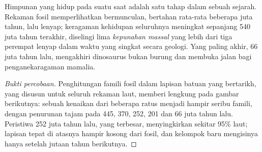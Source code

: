 \begin{proposition}\label{prop:g10:biodiversity-scales:changes}
Himpunan  yang hidup pada suatu saat adalah satu tahap dalam
sebuah sejarah. Rekaman fosil memperlihatkan  bermunculan,
bertahan rata-rata beberapa juta tahun, lalu lenyap; keragaman
kehidupan seluruhnya meningkat sepanjang 540 juta tahun terakhir,
diselingi lima \emph{kepunahan massal} yang
lebih dari tiga perempat  lenyap dalam waktu yang singkat
secara geologi. Yang paling akhir, 66 juta tahun lalu, mengakhiri
dinosaurus bukan burung dan membuka jalan bagi penganekaragaman mamalia.
\end{proposition}
\begin{proof}[Bukti percobaan]
Penghitungan famili fosil dalam lapisan batuan yang bertarikh, yang
disusun untuk seluruh rekaman laut, memberi lengkung pada gambar
berikutnya: sebuah kenaikan dari beberapa ratus menjadi hampir seribu
famili, dengan penurunan tajam pada 445, 370, 252, 201 dan 66 juta
tahun lalu. Peristiwa 252 juta tahun lalu, yang terbesar,
menyingkirkan sekitar 95\%  laut; lapisan tepat di atasnya
hampir kosong dari fosil, dan kelompok baru mengisinya hanya setelah
jutaan tahun berikutnya.
\end{proof}

